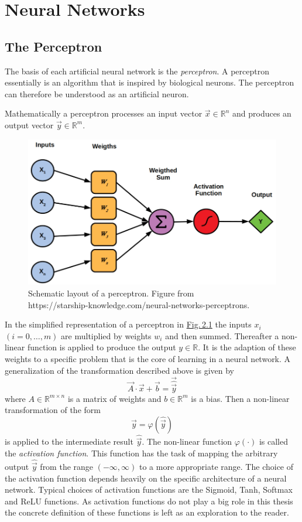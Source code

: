 \section{Neural Networks}
\subsection{The Perceptron}
The basis of each artificial neural network is the \textit{perceptron}. A perceptron essentially is an algorithm that is inspired by biological neurons. The perceptron can therefore be understood as an artificial neuron.

Mathematically a perceptron processes an input vector $\vec{x}\in\mathbb{R}^n$ and produces an output vector $\vec{y}\in\mathbb{R}^m$. 
%
\begin{figure} \label{fig:2.1}
    \centering
    \includegraphics[width=.5\textwidth]{Chapters/figures/perceptron.PNG}
    \caption[Schematic layout of a perceptron]{Schematic layout of a perceptron. Figure from\\ https://starship-knowledge.com/neural-networks-perceptrons.}
\end{figure}
%
In the simplified representation of a perceptron in \hyperref[fig:2.1]{Fig.\,2.1} the inputs $x_i$ $ (i=0,\dots,m)$ are multiplied by weights $w_i$ and then summed. Thereafter a non-linear function is applied to produce the output $y\in\mathbb{R}$. It is the adaption of these weights to a specific problem that is the core of learning in a neural network. A generalization of the transformation described above is given by
%
\begin{equation} \label{equ:2.1}
    \vec{A}\cdot\vec{x}+\vec{b}=\vec{\hat{\vec{y}}}
\end{equation}
%
where $A\in\mathbb{R}^{m\times n}$ is a matrix of weights and $b\in\mathbb{R}^m$ is a bias. Then a non-linear transformation of the form
%
\begin{equation} \label{equ:2.2}
    \vec{y}=\varphi(\hat{\vec{y}})
\end{equation}
%
is applied to the intermediate result $\hat{\vec{y}}$. The non-linear function $\varphi(\cdot)$ is called the \textit{activation function}. This function has the task of mapping the arbitrary output $\hat{\vec{y}}$ from the range $(-\infty,\infty)$ to a more appropriate range. The choice of the activation function depends heavily on the specific architecture of a neural network. Typical choices of activation functions are the Sigmoid, Tanh, Softmax and ReLU functions. As activation functions do not play a big role in this thesis the concrete definition of these functions is left as an exploration to the reader.
%
